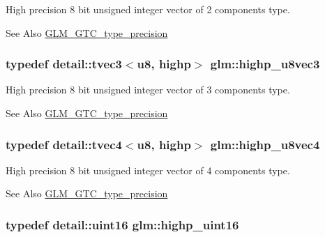 High precision 8 bit unsigned integer vector of 2 components type. \begin{DoxySeeAlso}{See Also}
\hyperlink{group__gtc__type__precision}{G\-L\-M\-\_\-\-G\-T\-C\-\_\-type\-\_\-precision} 
\end{DoxySeeAlso}
\hypertarget{group__gtc__type__precision_ga52bdf53a4f05023c13a9b817526d249f}{
\subsubsection[{highp\-\_\-u8vec3}]{\setlength{\rightskip}{0pt plus 5cm}typedef detail\-::tvec3$<$u8, highp$>$ {\bf glm\-::highp\-\_\-u8vec3}}}\label{group__gtc__type__precision_ga52bdf53a4f05023c13a9b817526d249f}
High precision 8 bit unsigned integer vector of 3 components type. \begin{DoxySeeAlso}{See Also}
\hyperlink{group__gtc__type__precision}{G\-L\-M\-\_\-\-G\-T\-C\-\_\-type\-\_\-precision} 
\end{DoxySeeAlso}
\hypertarget{group__gtc__type__precision_ga3a46f19674a65471988b41ffdaa834c5}{
\subsubsection[{highp\-\_\-u8vec4}]{\setlength{\rightskip}{0pt plus 5cm}typedef detail\-::tvec4$<$u8, highp$>$ {\bf glm\-::highp\-\_\-u8vec4}}}\label{group__gtc__type__precision_ga3a46f19674a65471988b41ffdaa834c5}
High precision 8 bit unsigned integer vector of 4 components type. \begin{DoxySeeAlso}{See Also}
\hyperlink{group__gtc__type__precision}{G\-L\-M\-\_\-\-G\-T\-C\-\_\-type\-\_\-precision} 
\end{DoxySeeAlso}
\hypertarget{group__gtc__type__precision_ga4d32967d45ba8365e2a05eaaac85e978}{
\subsubsection[{highp\-\_\-uint16}]{\setlength{\rightskip}{0pt plus 5cm}typedef detail\-::uint16 {\bf glm\-::highp\-\_\-uint16}}}\label{group__gtc__type__precision_ga4d32967d45ba8365e2a05eaaac85e978}
